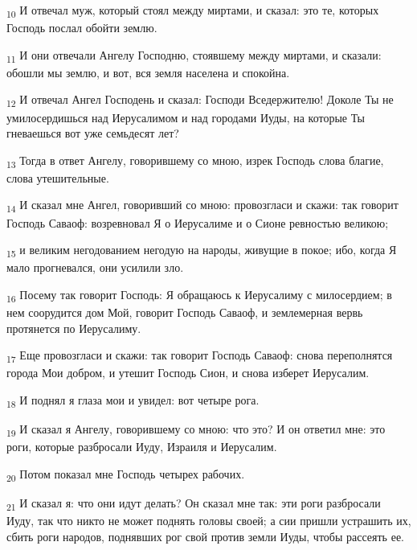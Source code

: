 \begin{tcolorbox}
\textsubscript{10} И отвечал муж, который стоял между миртами, и сказал: это те, которых Господь послал обойти землю.
\end{tcolorbox}
\begin{tcolorbox}
\textsubscript{11} И они отвечали Ангелу Господню, стоявшему между миртами, и сказали: обошли мы землю, и вот, вся земля населена и спокойна.
\end{tcolorbox}
\begin{tcolorbox}
\textsubscript{12} И отвечал Ангел Господень и сказал: Господи Вседержителю! Доколе Ты не умилосердишься над Иерусалимом и над городами Иуды, на которые Ты гневаешься вот уже семьдесят лет?
\end{tcolorbox}
\begin{tcolorbox}
\textsubscript{13} Тогда в ответ Ангелу, говорившему со мною, изрек Господь слова благие, слова утешительные.
\end{tcolorbox}
\begin{tcolorbox}
\textsubscript{14} И сказал мне Ангел, говоривший со мною: провозгласи и скажи: так говорит Господь Саваоф: возревновал Я о Иерусалиме и о Сионе ревностью великою;
\end{tcolorbox}
\begin{tcolorbox}
\textsubscript{15} и великим негодованием негодую на народы, живущие в покое; ибо, когда Я мало прогневался, они усилили зло.
\end{tcolorbox}
\begin{tcolorbox}
\textsubscript{16} Посему так говорит Господь: Я обращаюсь к Иерусалиму с милосердием; в нем соорудится дом Мой, говорит Господь Саваоф, и землемерная вервь протянется по Иерусалиму.
\end{tcolorbox}
\begin{tcolorbox}
\textsubscript{17} Еще провозгласи и скажи: так говорит Господь Саваоф: снова переполнятся города Мои добром, и утешит Господь Сион, и снова изберет Иерусалим.
\end{tcolorbox}
\begin{tcolorbox}
\textsubscript{18} И поднял я глаза мои и увидел: вот четыре рога.
\end{tcolorbox}
\begin{tcolorbox}
\textsubscript{19} И сказал я Ангелу, говорившему со мною: что это? И он ответил мне: это роги, которые разбросали Иуду, Израиля и Иерусалим.
\end{tcolorbox}
\begin{tcolorbox}
\textsubscript{20} Потом показал мне Господь четырех рабочих.
\end{tcolorbox}
\begin{tcolorbox}
\textsubscript{21} И сказал я: что они идут делать? Он сказал мне так: эти роги разбросали Иуду, так что никто не может поднять головы своей; а сии пришли устрашить их, сбить роги народов, поднявших рог свой против земли Иуды, чтобы рассеять ее.
\end{tcolorbox}
